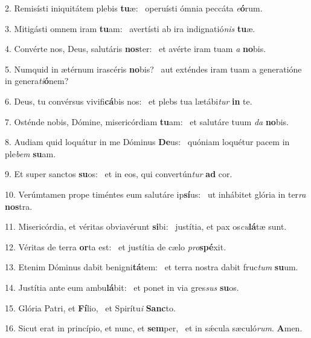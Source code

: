 2. Remisísti iniquitátem plebis \textbf{tu}æ: \ast\  operuísti ómnia peccáta \textit{e}\textbf{ó}rum.\

3. Mitigásti omnem iram \textbf{tu}am: \ast\  avertísti ab ira indignatió\textit{nis} \textbf{tu}æ.\

4. Convérte nos, Deus, salutáris \textbf{nos}ter: \ast\  et avérte iram tuam \textit{a} \textbf{no}bis.\

5. Numquid in ætérnum irascéris \textbf{no}bis? \ast\  aut exténdes iram tuam a generatióne in genera\textit{ti}\textbf{ó}nem?\

6. Deus, tu convérsus vivifi\textbf{cá}bis nos: \ast\  et plebs tua lætábi\textit{tur} \textbf{in} te.\

7. Osténde nobis, Dómine, misericórdiam \textbf{tu}am: \ast\  et salutáre tuum \textit{da} \textbf{no}bis.\

8. Audiam quid loquátur in me Dóminus \textbf{De}us: \ast\  quóniam loquétur pacem in ple\textit{bem} \textbf{su}am.\

9. Et super sanctos \textbf{su}os: \ast\  et in eos, qui convertún\textit{tur} \textbf{ad} cor.\

10. Verúmtamen prope timéntes eum salutáre ip\textbf{sí}us: \ast\  ut inhábitet glória in ter\textit{ra} \textbf{nos}tra.\

11. Misericórdia, et véritas obviavérunt \textbf{si}bi: \ast\  justítia, et pax os\textit{cu}\textbf{lá}tæ sunt.\

12. Véritas de terra \textbf{or}ta est: \ast\  et justítia de cælo \textit{pro}\textbf{spé}xit.\

13. Etenim Dóminus dabit benigni\textbf{tá}tem: \ast\  et terra nostra dabit fruc\textit{tum} \textbf{su}um.\

14. Justítia ante eum ambu\textbf{lá}bit: \ast\  et ponet in via gres\textit{sus} \textbf{su}os.\

15. Glória Patri, et \textbf{Fí}lio, \ast\  et Spirítu\textit{i} \textbf{Sanc}to.\

16. Sicut erat in princípio, et nunc, et \textbf{sem}per, \ast\  et in sǽcula sæculó\textit{rum}. \textbf{A}men.\

